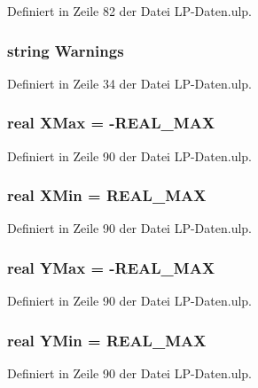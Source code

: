 Definiert in Zeile 82 der Datei L\+P-\/\+Daten.\+ulp.

\hypertarget{_l_p-_daten_8ulp_a8b775f7be4cc29c7bd924e870dc67b64}{}
\subsubsection[{Warnings}]{\setlength{\rightskip}{0pt plus 5cm}string Warnings}\label{_l_p-_daten_8ulp_a8b775f7be4cc29c7bd924e870dc67b64}


Definiert in Zeile 34 der Datei L\+P-\/\+Daten.\+ulp.

\hypertarget{_l_p-_daten_8ulp_aeaec557beb34472feff2cb21ba458b09}{}
\subsubsection[{X\+Max}]{\setlength{\rightskip}{0pt plus 5cm}real X\+Max = -\/R\+E\+A\+L\+\_\+\+M\+A\+X}\label{_l_p-_daten_8ulp_aeaec557beb34472feff2cb21ba458b09}


Definiert in Zeile 90 der Datei L\+P-\/\+Daten.\+ulp.

\hypertarget{_l_p-_daten_8ulp_a978c5c7f4d89b1dd09870542306e065c}{}
\subsubsection[{X\+Min}]{\setlength{\rightskip}{0pt plus 5cm}real X\+Min = R\+E\+A\+L\+\_\+\+M\+A\+X}\label{_l_p-_daten_8ulp_a978c5c7f4d89b1dd09870542306e065c}


Definiert in Zeile 90 der Datei L\+P-\/\+Daten.\+ulp.

\hypertarget{_l_p-_daten_8ulp_a6b5cc99ec8ac1929b5ca571f5a0f56c8}{}
\subsubsection[{Y\+Max}]{\setlength{\rightskip}{0pt plus 5cm}real Y\+Max = -\/R\+E\+A\+L\+\_\+\+M\+A\+X}\label{_l_p-_daten_8ulp_a6b5cc99ec8ac1929b5ca571f5a0f56c8}


Definiert in Zeile 90 der Datei L\+P-\/\+Daten.\+ulp.

\hypertarget{_l_p-_daten_8ulp_a7bad6a0d655aa9b7a6c2bb3b26a89f3a}{}
\subsubsection[{Y\+Min}]{\setlength{\rightskip}{0pt plus 5cm}real Y\+Min = R\+E\+A\+L\+\_\+\+M\+A\+X}\label{_l_p-_daten_8ulp_a7bad6a0d655aa9b7a6c2bb3b26a89f3a}


Definiert in Zeile 90 der Datei L\+P-\/\+Daten.\+ulp.

